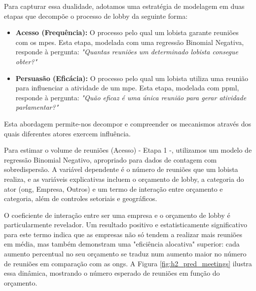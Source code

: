 Para capturar essa dualidade, adotamos uma estratégia de modelagem em duas etapas que decompõe o processo de lobby da seguinte forma:
\begin{itemize}
    \item \textbf{Acesso (Frequência):} O processo pelo qual um lobista garante reuniões com os \acrshort{mpe}s. Esta etapa, modelada com uma regressão Binomial Negativa, responde à pergunta: \textit{"Quantas reuniões um determinado lobista consegue obter?"}
    \item \textbf{Persuasão (Eficácia):} O processo pelo qual um lobista utiliza uma reunião para influenciar a atividade de um \acrshort{mpe}. Esta etapa, modelada com \acrshort{ppml}, responde à pergunta: \textit{"Quão eficaz é uma única reunião para gerar atividade parlamentar?"}
\end{itemize}

Esta abordagem permite-nos decompor e compreender os mecanismos através dos quais diferentes atores exercem influência.

Para estimar o volume de reuniões (Acesso) - Etapa 1 -, utilizamos um modelo de regressão Binomial Negativo, apropriado para dados de contagem com sobredispersão. A variável dependente é o número de reuniões que um lobista realiza, e as variáveis explicativas incluem o orçamento de lobby, a categoria do ator (\acrshort{ong}, Empresa, Outros) e um termo de interação entre orçamento e categoria, além de controles setoriais e geográficos.

O coeficiente de interação entre ser uma empresa e o orçamento de lobby é particularmente revelador. Um resultado positivo e estatisticamente significativo para este termo indica que as empresas não só tendem a realizar mais reuniões em média, mas também demonstram uma "eficiência alocativa" superior: cada aumento percentual no seu orçamento se traduz num aumento maior no número de reuniões em comparação com as \acrshort{ong}s. A Figura \ref{fig:h2_pred_meetings} ilustra essa dinâmica, mostrando o número esperado de reuniões em função do orçamento.

